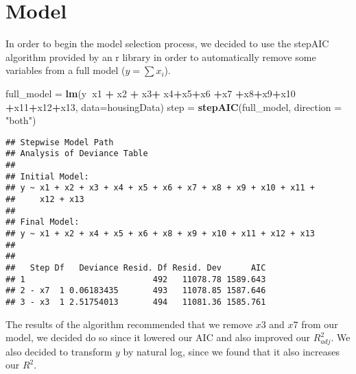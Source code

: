 \documentclass[]{article}
\newenvironment{Shaded}{\begin{snugshade}}{\end{snugshade}}
\newcommand{\KeywordTok}[1]{\textcolor[rgb]{0.13,0.29,0.53}{\textbf{#1}}}
\newcommand{\DataTypeTok}[1]{\textcolor[rgb]{0.13,0.29,0.53}{#1}}
\newcommand{\StringTok}[1]{\textcolor[rgb]{0.31,0.60,0.02}{#1}}
\newcommand{\OperatorTok}[1]{\textcolor[rgb]{0.81,0.36,0.00}{\textbf{#1}}}
\newcommand{\NormalTok}[1]{#1}
\begin{document}
\section{Model}\label{model}

In order to begin the model selection process, we decided to use the
stepAIC algorithm provided by an r library in order to automatically
remove some variables from a full model (\(y=\sum x_i\)).

\begin{Shaded}
\begin{Highlighting}[]
\NormalTok{full_model =}\StringTok{ }\KeywordTok{lm}\NormalTok{(y}\OperatorTok{~}\NormalTok{x1 }\OperatorTok{+}\StringTok{ }\NormalTok{x2 }\OperatorTok{+}\StringTok{ }\NormalTok{x3}\OperatorTok{+}\StringTok{ }\NormalTok{x4}\OperatorTok{+}\NormalTok{x5}\OperatorTok{+}\NormalTok{x6 }\OperatorTok{+}\NormalTok{x7 }\OperatorTok{+}\NormalTok{x8}\OperatorTok{+}\NormalTok{x9}\OperatorTok{+}\NormalTok{x10 }\OperatorTok{+}\NormalTok{x11}\OperatorTok{+}\NormalTok{x12}\OperatorTok{+}\NormalTok{x13, }\DataTypeTok{data=}\NormalTok{housingData)}
\NormalTok{step =}\StringTok{ }\KeywordTok{stepAIC}\NormalTok{(full_model, }\DataTypeTok{direction =} \StringTok{"both"}\NormalTok{)}
\end{Highlighting}
\end{Shaded}

\begin{Shaded}
\end{Shaded}

\begin{verbatim}
## Stepwise Model Path 
## Analysis of Deviance Table
## 
## Initial Model:
## y ~ x1 + x2 + x3 + x4 + x5 + x6 + x7 + x8 + x9 + x10 + x11 + 
##     x12 + x13
## 
## Final Model:
## y ~ x1 + x2 + x4 + x5 + x6 + x8 + x9 + x10 + x11 + x12 + x13
## 
## 
##   Step Df   Deviance Resid. Df Resid. Dev      AIC
## 1                          492   11078.78 1589.643
## 2 - x7  1 0.06183435       493   11078.85 1587.646
## 3 - x3  1 2.51754013       494   11081.36 1585.761
\end{verbatim}

The results of the algorithm recommended that we remove \(x3\) and
\(x7\) from our model, we decided do so since it lowered our AIC and
also improved our \(R^2_{adj}\). We also decided to transform \(y\) by
natural log, since we found that it also increases our \(R^2\).
\end{document}
